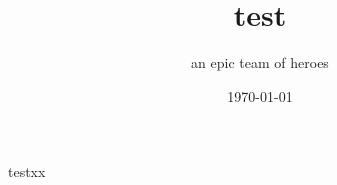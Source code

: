 \documentclass[12pt]{article}
\begin{document}
\title{test}
\author{an epic team of heroes}
\date{\today}
\maketitle

testxx
\end{document}
